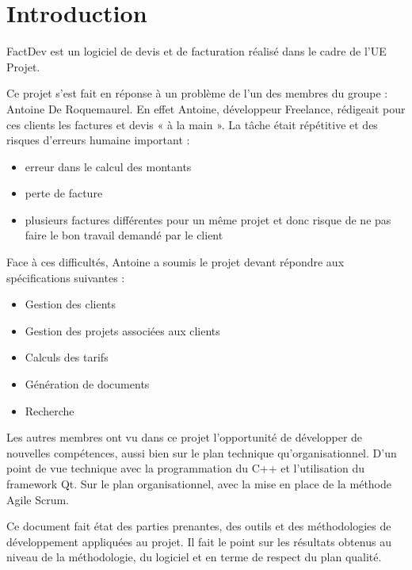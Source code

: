 \chapter*{Introduction}

\setlength{\parindent}{1cm}
FactDev est un logiciel de devis et de facturation réalisé dans le cadre de l’UE Projet. 

Ce projet s’est fait en réponse à un problème de l’un des membres du groupe : Antoine De Roquemaurel. En effet Antoine, développeur Freelance, rédigeait pour ces clients les factures et devis « à la main ». La tâche était répétitive et des risques d’erreurs humaine important : 
\begin{itemize}
	\item erreur dans le calcul des montants
	\item perte de facture
	\item plusieurs factures différentes pour un même projet et donc risque de ne pas faire le bon travail demandé par le client
\end{itemize}

Face à ces difficultés, Antoine a soumis le projet devant répondre aux spécifications suivantes :
\begin{itemize}
	\item Gestion des clients
	\item Gestion des projets associées aux clients
	\item Calculs des tarifs
	\item Génération de documents
	\item Recherche
\end{itemize}


Les autres membres ont vu dans ce projet l'opportunité de développer de nouvelles compétences, aussi bien sur le plan technique qu'organisationnel. D'un point de vue technique avec la programmation du C++ et l'utilisation du framework Qt. Sur le plan organisationnel, avec la mise en place de la méthode Agile Scrum. 

Ce document fait état des parties prenantes, des outils et des méthodologies de développement appliquées au projet. Il fait le point sur les résultats obtenus au niveau de la méthodologie, du logiciel et en terme de respect du plan qualité. 